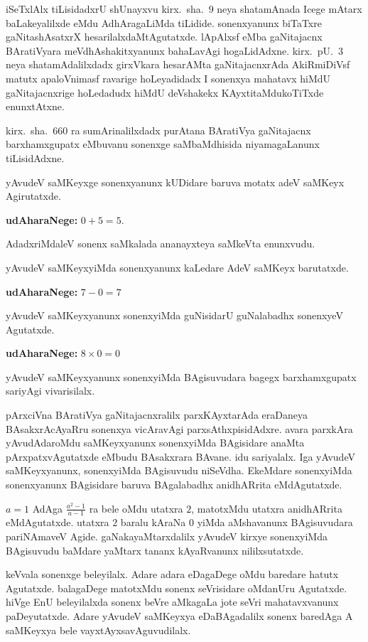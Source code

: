 iSeTxlAlx tiLisidadxrU shUnayxvu kirx.~sha.\ $9$ neya shatamAnada Icege mAtarx baLakeyalilxde eMdu AdhAragaLiMda tiLidide. sonenxyanunx biTaTxre gaNitashAsatxrX hesarilalx\-daMtAgutatxde. lApAlxsf eMba gaNitajacnx BAratiVyara meVdhAshakitxyanunx bahaLavAgi hogaLidAdxne. kirx.~pU.\ $3$ neya shatamAdalilxdadx girxVkara hesarAMta gaNitajacnxrAda AkiRmiDiVsf matutx apaloVnimasf ravarige hoLeyadidadx  I sonenxya mahatavx hiMdU \-gaNitajacnxrige hoLedadudx hiMdU deVshakekx KAyxtitaMdukoTiTxde enunxtAtxne.

kirx.~sha.\ $660$ ra sumArinalilxdadx purAtana BAratiVya gaNitajacnx barxhamxgupatx eMbuvanu sonenxge saMbaMdhisida niyamagaLanunx tiLisidAdxne.

yAvudeV saMKeyxge sonenxyanunx kUDidare baruva motatx adeV saMKeyx Agirutatxde. 

\textbf{udAharaNege:} $0+5=5$.

AdadxriMdaleV sonenx saMkalada ananayxteya saMkeVta enunxvudu.

yAvudeV saMKeyxyiMda sonenxyanunx kaLedare AdeV saMKeyx barutatxde.

\textbf{udAharaNege:} $7-0=7$

yAvudeV saMKeyxyanunx sonenxyiMda guNisidarU guNalabadhx sonenxyeV Agutatxde. 

\textbf{udAharaNege:} $8\times 0 = 0$

yAvudeV saMKeyxyanunx sonenxyiMda BAgisuvudara bagegx barxhamxgupatx sariyAgi vivarisilalx.

pArxciVna BAratiVya gaNitajacnxralilx parxKAyxtarAda eraDaneya BAsakxrAcAyaRru sonenxya vicAravAgi parxsAthxpisidAdxre. avara parxkAra yAvudAdaroMdu saMKeyx\-yanunx sonenxyiMda BAgisidare anaMta pArxpatxvAgutatxde eMbudu BAsakxrara BAvane. idu sariyalalx. Iga yAvudeV saMKeyxyanunx, sonenxyiMda BAgisuvudu niSeVdha. EkeMdare sonenxyiMda sonenxyanunx BAgisidare baruva BAgalabadhx anidhARrita 
eMdAgutatxde.

$a=1$ AdAga $\frac{a^2-1}{a-1}$ ra bele oMdu utatxra $2$, matotxMdu utatxra anidhARrita eMdAgutatxde. utatxra $2$ baralu kAraNa $0$ yiMda aMshavanunx BAgisuvudara pari\-NAmaveV Agide. gaNakayaMtarxdalilx yAvudeV kirxye sonenxyiMda BAgisuvudu baMdare yaMtarx tananx kAyaRvanunx nililxsutatxde.

keVvala sonenxge beleyilalx. Adare adara eDagaDege oMdu baredare hatutx Agutatxde. balagaDege matotxMdu sonenx seVrisidare oMdanUru Agutatxde. hiVge EnU beleyilalxda sonenx beVre aMkagaLa jote seVri mahatavxvanunx paDeyutatxde. Adare yAvudeV saMKeyxya eDaBAgadalilx sonenx baredAga A saMKeyxya bele vayxtAyxsavAguvudilalx. 

